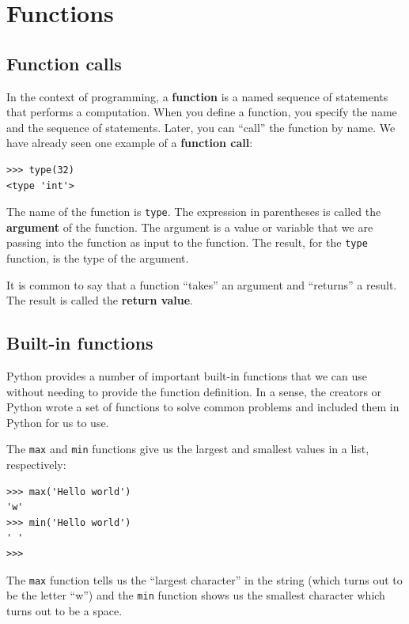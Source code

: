 \documentclass[10pt]{book}
\begin{document}
\chapter{Functions}
\label{funcchap}

\section{Function calls}
\label{functionchap}

In the context of programming, a {\bf function} is a named sequence of
statements that performs a computation.  When you define a function,
you specify the name and the sequence of statements.  Later, you can
``call'' the function by name.  
We have already seen one example of a {\bf function call}:

\beforeverb
\begin{verbatim}
>>> type(32)
<type 'int'>
\end{verbatim}
\afterverb
%
The name of the function is {\tt type}.  The expression in parentheses
is called the {\bf argument} of the function.  The argument is 
a value or variable that we are passing into the function as input 
to the function.  
The result, for the {\tt type} function, is the type of the argument.


It is common to say that a function ``takes'' an argument and ``returns''
a result.  The result is called the {\bf return value}.


\section{Built-in functions}

Python provides a number of important built-in functions that
we can use without needing to provide the function definition.
In a sense, the creators or Python wrote a set of functions 
to solve common problems and included them in Python for us to use.

The {\tt max} and {\tt min} functions give us the largest and 
smallest values in a list, respectively:

\beforeverb
\begin{verbatim}
>>> max('Hello world')
'w'
>>> min('Hello world')
' '
>>>
\end{verbatim}
\afterverb
%
The {\tt max} function tells us the ``largest character'' in the 
string (which turns out to be the letter ``w'') and the {\tt min}
function shows us the smallest character which turns out to be a 
space.
\end{document}
